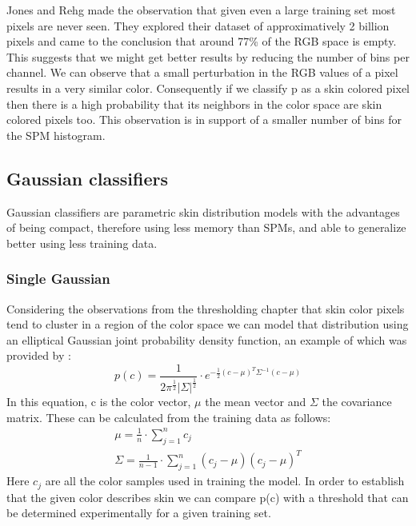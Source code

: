 \documentclass[12pt]{report}
\begin{document}
	Jones and Rehg\cite{compaq} made the observation that given even a large training set most pixels are never seen. They explored their dataset of approximatively 2 billion pixels and came to the conclusion that around 77\% of the RGB space is empty. This suggests that we might get better results by reducing the number of bins per channel. We can observe that a small perturbation in the RGB values of a pixel results in a very similar color. Consequently if we classify p as a skin colored pixel then there is a high probability that its neighbors in the color space are skin colored pixels too. This observation is in support of a smaller number of bins for the SPM histogram.  
	
	\subsection{Gaussian classifiers}
	Gaussian classifiers are parametric skin distribution models with the advantages of being compact, therefore using less memory than SPMs, and able to generalize better using less training data\cite{survey_skin_color_modeling}.
	
	\subsubsection{Single Gaussian}
	Considering the observations from the thresholding chapter that skin color pixels tend to cluster in a region of the color space we can model that distribution using an elliptical Gaussian joint probability density function, an example of which was provided by \cite{survey_skin_color_modeling}:
	\begin{equation}
	p(c) = \frac{1}{2\pi^\frac{1}{2}|\Sigma|^\frac{1}{2}} \cdot e^{-\frac{1}{2}(c - \mu)^T\Sigma^{-1}(c - \mu)}
	\end{equation}
	In this equation, c is the color vector, \(\mu\) the mean vector and \(\Sigma\) the covariance matrix. These can be calculated from the training data as follows:
	\begin{equation}
	\begin{split}
	\mu = \frac{1}{n} \cdot \sum_{j=1}^{n} c_j \\
	\Sigma = \frac{1}{n - 1} \cdot \sum_{j=1}^{n}(c_j - \mu)(c_j - \mu)^T
	\end{split}
	\end{equation}
	Here \(c_j\) are all the color samples used in training the model. In order to establish that the given color describes skin we can compare p(c) with a threshold that can be determined experimentally for a given training set.
	
\end{document}
